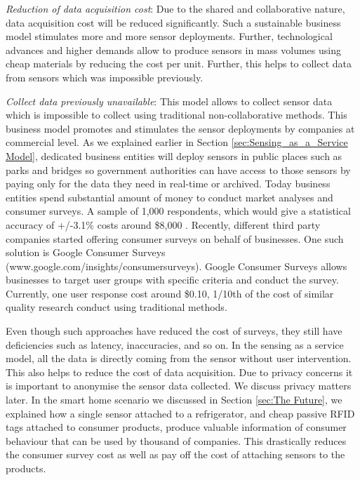 \documentclass[times]{ettauth}
\newenvironment{noindlist}
 {\begin{list}{\labelitemi}{\leftmargin=1.2em \itemindent=-.5em}}
 {\end{list}}
\begin{document}
\begin{noindlist}
\item  \textit{Reduction of data acquisition cost}: Due to the shared and collaborative nature,  data acquisition cost will be reduced significantly. Such a sustainable business model stimulates more and more sensor deployments. Further, technological advances and higher demands allow to produce sensors in mass volumes using cheap materials by reducing the cost per unit. Further, this helps to  collect  data from sensors which was impossible previously.


\item  \textit{Collect data previously unavailable}: This model allows to collect sensor data which is impossible to collect using traditional non-collaborative methods. This business model promotes and stimulates the sensor deployments by companies at commercial level. As we explained earlier in Section \ref{sec:Sensing_as_a_Service Model}, dedicated business entities will deploy sensors in public places such as parks and bridges so  government authorities can have access to those sensors by paying only for the data they need in real-time or archived. Today business entities spend substantial amount of money to conduct market analyses and consumer surveys. A sample of 1,000 respondents, which would give a statistical accuracy of +/-3.1\% costs around \$8,000 \cite{P632}. Recently, different third party companies started offering consumer surveys on behalf of businesses. One such solution is Google Consumer Surveys (www.google.com/insights/consumersurveys). Google Consumer Surveys allows businesses to target user groups with specific criteria and conduct the survey. Currently, one user response cost around \$0.10, 1/10th of the cost of similar quality research conduct using traditional methods. 

Even though such approaches have reduced the cost of surveys, they still have deficiencies such as latency, inaccuracies, and so on. In the sensing as a service model, all the data is directly coming from the sensor without user intervention. This also helps to reduce the cost of data acquisition. Due to privacy concerns it is important to anonymise the sensor data collected. We discuss privacy matters later. In the smart home scenario we discussed in Section \ref{sec:The Future}, we explained how a  single sensor attached to a refrigerator, and cheap passive RFID tags attached to consumer products, produce valuable information of consumer behaviour that can be used by thousand of companies. This drastically reduces the consumer survey cost as well as pay off the cost of attaching sensors to the products.




\end{noindlist}
\end{document}
